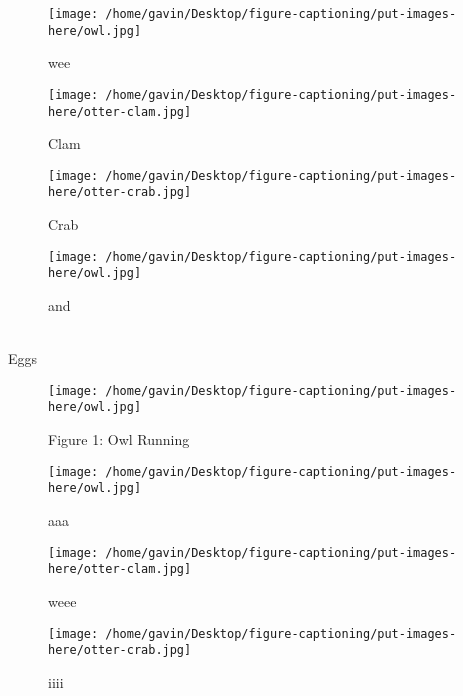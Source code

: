 
                \begin{figure}
                  \caption{wee}
                  \begin{center}
                    \texttt{[image: /home/gavin/Desktop/figure-captioning/put-images-here/owl.jpg]}
                    \label{fig:owl}
                  \end{center}
                \end{figure}
                \begin{figure}
                  \caption{Clam}
                  \begin{center}
                    \texttt{[image: /home/gavin/Desktop/figure-captioning/put-images-here/otter-clam.jpg]}
                    \label{fig:otter-clam}
                  \end{center}
                \end{figure}
                \begin{figure}
                  \caption{Crab}
                  \begin{center}
                    \texttt{[image: /home/gavin/Desktop/figure-captioning/put-images-here/otter-crab.jpg]}
                    \label{fig:otter-crab}
                  \end{center}
                \end{figure}
\begin{figure}
\caption{and}
\begin{center}
\texttt{[image: /home/gavin/Desktop/figure-captioning/put-images-here/owl.jpg]}
\label{fig:owl}
\end{center}
\end{figure}
\\Eggs
\begin{figure}
\caption{Figure 1: Owl Running}
\begin{center}
\texttt{[image: /home/gavin/Desktop/figure-captioning/put-images-here/owl.jpg]}
\label{fig:owl}
\end{center}
\end{figure}
\begin{figure}
\caption{aaa}
\begin{center}
\texttt{[image: /home/gavin/Desktop/figure-captioning/put-images-here/owl.jpg]}
\label{fig:owl}
\end{center}
\end{figure}
\begin{figure}
\caption{weee}
\begin{center}
\texttt{[image: /home/gavin/Desktop/figure-captioning/put-images-here/otter-clam.jpg]}
\label{fig:otter-clam}
\end{center}
\end{figure}
\begin{figure}
\caption{iiii}
\begin{center}
\texttt{[image: /home/gavin/Desktop/figure-captioning/put-images-here/otter-crab.jpg]}
\label{fig:otter-crab}
\end{center}
\end{figure}